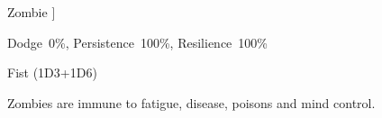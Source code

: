 \begin{samepage}
\begin{monsterbox}{Zombie}
	]
	\rpghline
	\begin{rpg-monsteraction}[Resistances]
		Dodge~0\%, Persistence~100\%, Resilience~100\%
	\end{rpg-monsteraction}
	\begin{rpg-monsteraction}
		Fist (1D3+1D6)
	\end{rpg-monsteraction}
	\begin{rpg-monsteraction}[Immunities]
		Zombies are immune to fatigue, disease, poisons and mind control.
	\end{rpg-monsteraction}
\end{monsterbox}
\end{samepage}
	

